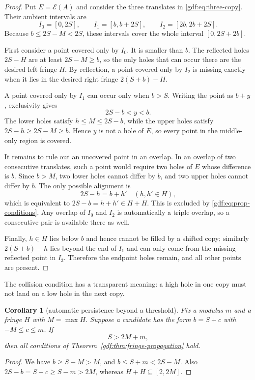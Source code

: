 \documentclass[11pt,a4paper]{article}
\numberwithin{equation}{section}
\newtheorem{corollary}[theorem]{Corollary}
\theoremstyle{definition}
\theoremstyle{remark}
\theoremstyle{plain}
\newcommand{\cE}{\mathcal E}
\begin{document}
\begin{proof}
Put $E=\cE(A)$ and consider the three translates in
\eqref{gdf:eq:three-copy}.  Their ambient intervals are
\[
 I_0=[0,2S],\qquad I_1=[b,b+2S],\qquad
 I_2=[2b,2b+2S].
\]
Because $b\le2S-M<2S$, these intervals cover the whole interval
$[0,2S+2b]$.

First consider a point covered only by $I_0$.  It is smaller than $b$.
The reflected holes $2S-H$ are at least $2S-M\ge b$, so the only holes that
can occur there are the desired left fringe $H$.  By reflection, a point
covered only by $I_2$ is missing exactly when it lies in the desired right
fringe $2(S+b)-H$.

A point covered only by $I_1$ can occur only when $b>S$.  Writing the point as
$b+y$, exclusivity gives
\[
 2S-b<y<b.
\]
The lower holes satisfy $h\le M\le2S-b$, while the upper holes satisfy
$2S-h\ge2S-M\ge b$.  Hence $y$ is not a hole of $E$, so every point in the
middle-only region is covered.

It remains to rule out an uncovered point in an overlap.  In an overlap of
two consecutive translates, such a point would require two holes of $E$ whose
difference is $b$.  Since $b>M$, two lower holes cannot differ by $b$, and two
upper holes cannot differ by $b$.  The only possible alignment is
\[
 2S-h=b+h'
 \quad(h,h'\in H),
\]
which is equivalent to $2S-b=h+h'\in H+H$.  This is excluded by
\eqref{gdf:eq:prop-conditions}.  Any overlap of $I_0$ and $I_2$ is automatically a
triple overlap, so a consecutive pair is available there as well.

Finally, $h\in H$ lies below $b$ and hence cannot be filled by a shifted copy;
similarly $2(S+b)-h$ lies beyond the end of $I_1$ and can only come from the
missing reflected point in $I_2$.  Therefore the endpoint holes remain, and
all other points are present.
\end{proof}

The collision condition has a transparent meaning: a high hole in one copy
must not land on a low hole in the next copy.

\begin{corollary}[automatic persistence beyond a threshold]
\label{gdf:cor:automatic-persistence}
Fix a modulus $m$ and a fringe $H$ with $M=\max H$.  Suppose a candidate has
the form $b=S+c$ with $-M\le c\le m$.  If
\[
 S>2M+m,
\]
then all conditions of Theorem~\ref{gdf:thm:fringe-propagation} hold.
\end{corollary}

\begin{proof}
We have $b\ge S-M>M$, and $b\le S+m<2S-M$.  Also
$2S-b=S-c\ge S-m>2M$, whereas $H+H\subseteq[2,2M]$.
\end{proof}
\end{document}

